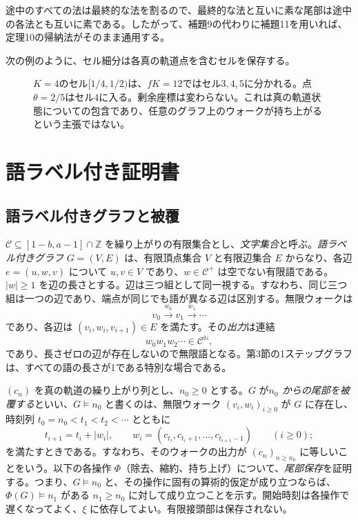 \documentclass[11pt,reqno]{amsart}
\theoremstyle{definition}
\theoremstyle{definition}
\theoremstyle{remark}
\begin{document}
途中のすべての法は最終的な法を割るので、最終的な法と互いに素な尾部は途中の各法とも互いに素である。したがって、補題9の代わりに補題11を用いれば、定理10の帰納法がそのまま通用する。

次の例のように、セル細分は各真の軌道点を含むセルを保存する。

\begin{figure}[htbp]
\centering

\caption{\(K=4\)のセル\([1/4,1/2)\)は、\(fK=12\)ではセル\(3,4,5\)に分かれる。点\(\theta=2/5\)はセル\(4\)に入る。剰余座標は変わらない。これは真の軌道状態についての包含であり、任意のグラフ上のウォークが持ち上がるという主張ではない。}
\label{fig:cell-refinement}
\end{figure}

\section{語ラベル付き証明書}\label{sec:4}

\subsection{語ラベル付きグラフと被覆}\label{sec:4.1}

\(\mathcal C\subseteq[1-b,a-1]\cap\mathbb Z\) を繰り上がりの有限集合とし、\emph{文字集合}と呼ぶ。\emph{語ラベル付きグラフ} \(G=(V,E)\) は、有限頂点集合 \(V\) と有限辺集合 \(E\) からなり、各辺 \(e=(u,w,v)\) について \(u,v\in V\) であり、\(w\in\mathcal C^{+}\) は空でない有限語である。\(|w|\ge1\) を辺の長さとする。辺は三つ組として同一視する。すなわち、同じ三つ組は一つの辺であり、端点が同じでも語が異なる辺は区別する。無限ウォークは
\[
v_0\xrightarrow{w_0}v_1\xrightarrow{w_1}\cdots
\]
であり、各辺は \((v_i,w_i,v_{i+1})\in E\) を満たす。その\emph{出力}は連結
\[
w_0w_1w_2\cdots\in\mathcal C^{\mathbb N},
\]
であり、長さゼロの辺が存在しないので無限語となる。第3節の1ステップグラフは、すべての語の長さが1である特別な場合である。

\((c_n)\) を真の軌道の繰り上がり列とし、\(n_0\ge0\) とする。\(G\) が\emph{\(n_0\) からの尾部を被覆する}といい、\(G\models n_0\) と書くのは、無限ウォーク \((v_i,w_i)_{i\ge0}\) が \(G\) に存在し、時刻列 \(t_0=n_0<t_1<t_2<\cdots\) とともに
\[
t_{i+1}=t_i+|w_i|,\qquad
w_i=(c_{t_i},c_{t_i+1},\ldots,c_{t_{i+1}-1})\qquad(i\ge0);
\]
を満たすときである。すなわち、そのウォークの出力が \((c_n)_{n\ge n_0}\) に等しいことをいう。以下の各操作 \(\Phi\)（除去、縮約、持ち上げ）について、\emph{尾部保存}を証明する。つまり、\(G\models n_0\) と、その操作に固有の算術的仮定が成り立つならば、\(\Phi(G)\models n_1\) がある \(n_1\ge n_0\) に対して成り立つことを示す。開始時刻は各操作で遅くなってよく、\(\xi\) に依存してよい。有限接頭部は保存されない。
\end{document}
